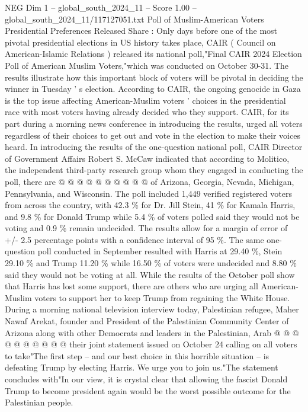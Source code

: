 \begin{textsample}{NEG Dim 1 – global\_south\_2024\_11 – Score 1.00 – global\_south\_2024\_11/117127051.txt}  \label{ex:f1_neg_281}
Poll of Muslim-American Voters Presidential Preferences Released Share : Only days before one of the most pivotal presidential elections in US history takes place, CAIR ( Council on American-Islamic Relations ) released its national poll,"Final CAIR 2024 Election Poll of American Muslim Voters,"which was conducted on October 30-31.
The results illustrate how this important block of voters will be pivotal in deciding the winner in Tuesday ' s election.
According to CAIR, the ongoing genocide in Gaza is the top issue affecting American-Muslim voters ' choices in the presidential race with most voters having already decided who they support.
CAIR, for its part during a morning news conference in introducing the results, urged all voters regardless of their choices to get out and vote in the election to make their voices heard.
In introducing the results of the one-question national poll, CAIR Director of Government Affairs Robert S.
McCaw indicated that according to Molitico, the independent third-party research group whom they engaged in conducting the poll, there are @ @ @ @ @ @ @ @ @ @ of Arizona, Georgia, Nevada, Michigan, Pennsylvania, and Wisconsin.
The poll included 1,449 verified registered voters from across the country, with 42.3 \% for Dr.
Jill Stein, 41 \% for Kamala Harris, and 9.8 \% for Donald Trump while 5.4 \% of voters polled said they would not be voting and 0.9 \% remain undecided.
The results allow for a margin of error of +/- 2.5 percentage points with a confidence interval of 95 \%.
The same one-question poll conducted in September resulted with Harris at 29.40 \%, Stein 29.10 \% and Trump 11.20 \% while 16.50 \% of voters were undecided and 8.80 \% said they would not be voting at all.
While the results of the October poll show that Harris has lost some support, there are others who are urging all American-Muslim voters to support her to keep Trump from regaining the White House.
During a morning national television interview today, Palestinian refugee, Maher Nawaf Arekat, founder and President of the Palestinian Community Center of Arizona along with other Democrats and leaders in the Palestinian, Arab @ @ @ @ @ @ @ @ @ @ their joint statement issued on October 24 calling on all voters to take"The first step -- and our best choice in this horrible situation -- is defeating Trump by electing Harris.
We urge you to join us."The statement concludes with"In our view, it is crystal clear that allowing the fascist Donald Trump to become president again would be the worst possible outcome for the Palestinian people.

\end{textsample}
